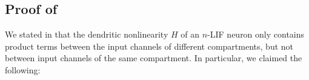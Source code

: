 
\subsection{Proof of }
\label{app:nlif_product_terms}

We stated in  that the dendritic nonlinearity $H$ of an $n$-LIF neuron only contains product terms between the input channels of different compartments, but not between input channels of the same compartment.
In particular, we claimed the following:

\ThmNlifProductTerms*

